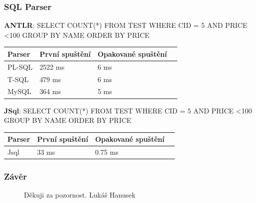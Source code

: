 \documentclass{beamer}
\begin{document}
\begin{frame}
  \frametitle{SQL Parser}

\begin{table}[!htbp]
	\small{\textbf{ANTLR}: SELECT COUNT(*) FROM TEST WHERE CID = 5 AND PRICE \textless  100 GROUP BY NAME ORDER BY PRICE}
	\vskip 0.1cm
	\begin{tabular}{llll}
		\hline
		Parser & První spuštění & Opakované spuštění\\
		\hline
		PL-SQL & 2522 ms & 6 ms  \\
        T-SQL & 479 ms & 6 ms  \\
        MySQL & 364 ms & 5 ms \\
		\hline
	\end{tabular}
\end{table}



\begin{table}[!htbp]
	\small{\textbf{JSql}: SELECT COUNT(*) FROM TEST WHERE CID = 5 AND PRICE \textless  100 GROUP BY NAME ORDER BY PRICE}
	\vskip 0.1cm
	\begin{tabular}{llll}
		\hline
		Parser & První spuštění & Opakované spuštění\\
		\hline
		Jsql & 33 ms & 0.75 ms\\
		\hline
	\end{tabular}
\end{table}


\end{frame}


\begin{frame}
\frametitle{Závěr}
    \begin{figure}[h]
  \centering
  Děkuji za pozornost.
  \vskip 3cm
  Lukáš Hanusek
\end{figure}
\end{frame}
\end{document}
